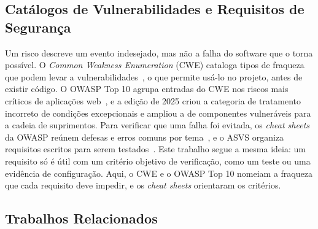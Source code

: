 \documentclass[conference]{IEEEtran}
\begin{document}
\subsection{Catálogos de Vulnerabilidades e Requisitos de Segurança}

Um risco descreve um evento indesejado, mas não a falha do software que o torna possível. O \textit{Common Weakness Enumeration} (CWE) cataloga tipos de fraqueza que podem levar a vulnerabilidades~\cite{mitrecwe}, o que permite usá-lo no projeto, antes de existir código. O OWASP Top 10 agrupa entradas do CWE nos riscos mais críticos de aplicações web~\cite{owasp2025top10}, e a edição de 2025 criou a categoria de tratamento incorreto de condições excepcionais e ampliou a de componentes vulneráveis para a cadeia de suprimentos. Para verificar que uma falha foi evitada, os \textit{cheat sheets} da OWASP reúnem defesas e erros comuns por tema~\cite{owaspcheatsheets}, e o ASVS organiza requisitos escritos para serem testados~\cite{owaspasvs2025}. Este trabalho segue a mesma ideia: um requisito só é útil com um critério objetivo de verificação, como um teste ou uma evidência de configuração. Aqui, o CWE e o OWASP Top 10 nomeiam a fraqueza que cada requisito deve impedir, e os \textit{cheat sheets} orientaram os critérios.

\subsection{Trabalhos Relacionados}
\label{subsec:trabalhos}
\end{document}
